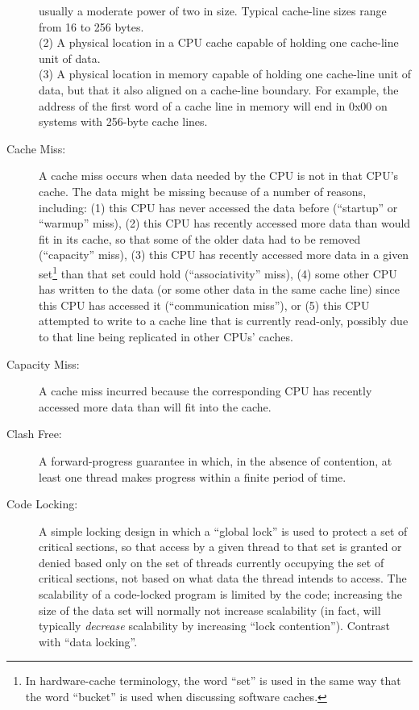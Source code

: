 \begin{description}
	usually a moderate power of two in size.
	Typical cache-line sizes range from 16 to 256 bytes. \\
	(2) A physical location in a CPU cache capable of holding
	one cache-line unit of data. \\
	(3) A physical location in memory capable of holding one
	cache-line unit of data, but that it also aligned
	on a cache-line boundary.
	For example, the address of the first word of a cache line
	in memory will end in 0x00 on systems with 256-byte cache lines.
\item[Cache Miss:]
	A cache miss occurs when data needed by the CPU is not in
	that CPU's cache.
	The data might be missing because of a number of reasons,
	including:
	(1) this CPU has never accessed the data before
	(``startup'' or ``warmup'' miss),
	(2) this CPU has recently accessed more
	data than would fit in its cache, so that some of the older
	data had to be removed (``capacity'' miss),
	(3) this CPU
	has recently accessed more data in a given set\footnote{
		In hardware-cache terminology, the word ``set''
		is used in the same way that the word ``bucket''
		is used when discussing software caches.}
	than that set could hold (``associativity'' miss),
	(4) some other CPU has written to the data (or some other
	data in the same cache line) since this CPU has accessed it
	(``communication miss''), or
	(5) this CPU attempted to write to a cache line that is
	currently read-only, possibly due to that line being replicated
	in other CPUs' caches.
\item[Capacity Miss:]
	A cache miss incurred because the corresponding CPU has recently
	accessed more data than will fit into the cache.
\item[Clash Free:]
	A forward-progress guarantee in which, in the absence of
	contention, at least one thread makes progress within a finite
	period of time.
\item[Code Locking:]
	A simple locking design in which a ``global lock'' is used to protect
	a set of critical sections, so that access by a given thread
	to that set is
	granted or denied based only on the set of threads currently
	occupying the set of critical sections, not based on what
	data the thread intends to access.
	The scalability of a code-locked program is limited by the code;
	increasing the size of the data set will normally not increase
	scalability (in fact, will typically \emph{decrease} scalability
	by increasing ``lock contention'').
	Contrast with ``data locking''.

\end{description}
